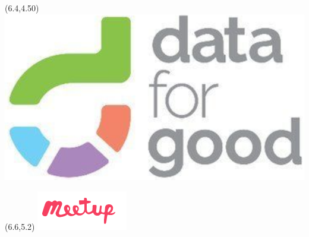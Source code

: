     \begin{textblock}{20}(6.4,4.50)
    \centering
    \includegraphics[scale=0.07]{GraphicFiles/Data4GoodLogo.png}
    \end{textblock}

    \begin{textblock}{20}(6.6,5.2)
    \centering
    \includegraphics[scale=0.5]{GraphicFiles/MeetUpLogo.png}
    \end{textblock}

